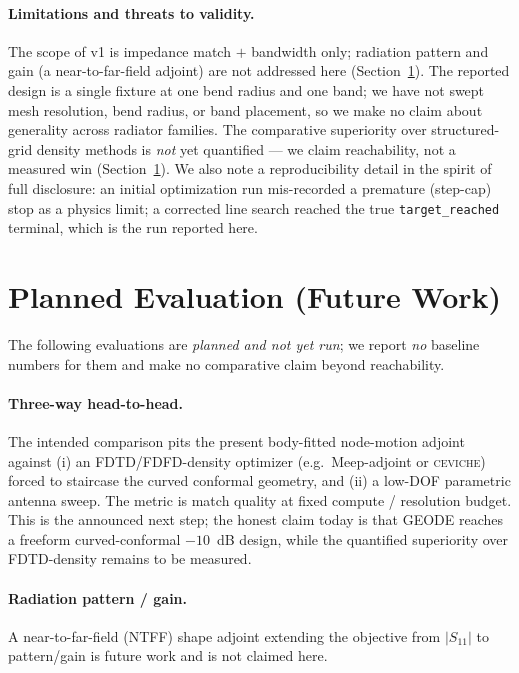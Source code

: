 \documentclass{anvil-paper}
\begin{document}
\paragraph{Limitations and threats to validity.}
The scope of v1 is impedance match $+$ bandwidth only; radiation pattern and
gain (a near-to-far-field adjoint) are not addressed here
(Section~\ref{sec:planned}). The reported design is a single fixture at one bend
radius and one band; we have not swept mesh resolution, bend radius, or band
placement, so we make no claim about generality across radiator families. The
comparative superiority over structured-grid density methods is
\emph{not} yet quantified --- we claim reachability, not a measured win
(Section~\ref{sec:planned}). We also note a reproducibility detail in the spirit
of full disclosure: an initial optimization run mis-recorded a premature
(step-cap) stop as a physics limit; a corrected line search reached the true
\texttt{target\_reached} terminal, which is the run reported here.

\section{Planned Evaluation (Future Work)}
\label{sec:planned}

The following evaluations are \emph{planned and not yet run}; we report
\emph{no} baseline numbers for them and make no comparative claim beyond
reachability.

\paragraph{Three-way head-to-head.}
The intended comparison pits the present body-fitted node-motion adjoint against
(i) an FDTD/FDFD-density optimizer (e.g.\ Meep-adjoint or \textsc{ceviche})
forced to staircase the curved conformal geometry, and (ii) a low-DOF
parametric antenna sweep. The metric is match quality at fixed compute /
resolution budget. This is the announced next step; the honest claim today is
that GEODE reaches a freeform curved-conformal $-10$~dB design, while the
quantified superiority over FDTD-density remains to be measured.

\paragraph{Radiation pattern / gain.}
A near-to-far-field (NTFF) shape adjoint extending the objective from
$|S_{11}|$ to pattern/gain is future work and is not claimed here.
\end{document}
